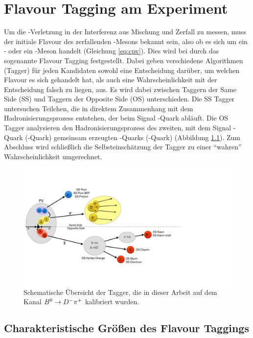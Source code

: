 \chapter{Flavour Tagging am \lhcb Experiment}

Um die \CP-Verletzung in der Interferenz aus Mischung und Zerfall zu messen, muss der initiale Flavour des zerfallenden \B-Mesons bekannt sein, also ob es sich um ein \Bz- oder ein \Bzb-Meson handelt (Gleichung \eqref{eq:cpv}). Dies wird bei \lhcb durch das sogenannte Flavour Tagging festgestellt. Dabei geben verschiedene Algorithmen (Tagger) für jeden Kandidaten sowohl eine Entscheidung darüber, um welchen Flavour es sich gehandelt hat, als auch eine Wahrscheinlichkeit mit der Entscheidung falsch zu liegen, aus. Es wird dabei zwischen Taggern der Same Side (SS) und Taggern der Opposite Side (OS) unterschieden. Die SS Tagger untersuchen Teilchen, die in direktem Zusammenhang mit dem Hadronisierungsprozess entstehen, der beim Signal \bquark-Quark abläuft. Die OS Tagger analysieren den Hadronisierungsprozess des zweiten, mit dem Signal \bquark-Quark (\bquarkbar-Quark) gemeinsam erzeugten \bquarkbar-Quarks (\bquark-Quark) (Abbildung \ref{fig:flavourtagging}). Zum Abschluss wird schließlich die Selbsteinschätzung der Tagger zu einer \enquote{wahren} Wahrscheinlichkeit umgerechnet. 
\begin{figure}[htpb]
	\centering
		\includegraphics[width=\textwidth]{fig/FT_schema.pdf}
	\caption{Schematische Übersicht der Tagger, die in dieser Arbeit auf dem Kanal ${{B}^0}\rightarrow D^-\pi^+$ kalibriert wurden.}
	\label{fig:flavourtagging} 
\end{figure}   

\section{Charakteristische Größen des Flavour Taggings}\label{sec:FTgrosse}

